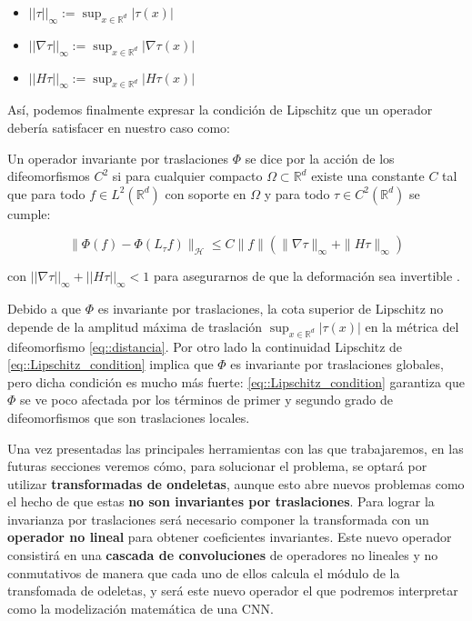\begin{itemize}
  \item $|| \tau ||_\infty := \sup_{x \in \mathbb{R}^d} |\tau(x)|$
  \item $||\nabla \tau ||_\infty := \sup_{x \in \mathbb{R}^d} |\nabla \tau(x)|$
  \item $||H \tau ||_\infty := \sup_{x \in \mathbb{R}^d} |H \tau(x)|$ 
\end{itemize}

\medskip

\noindent Así, podemos finalmente expresar la condición de Lipschitz que un operador debería satisfacer en nuestro caso como: 


\medskip

\begin{definicion} \label{def::Lipschitz_cont}
\noindent Un operador invariante por traslaciones $\Phi$ se dice  por la acción de los difeomorfismos $C^2$  si para cualquier compacto $\Omega \subset \mathbb{R}^d$ existe una constante $C$ tal que para todo $f \in L^2(\mathbb{R}^d)$ con soporte en $\Omega$ y para todo $\tau \in C^2(\mathbb{R}^d)$ se cumple:

\begin{equation} \label{eq::Lipschitz_condition}
  \| \Phi(f)-\Phi(L_{\tau}f)\|_\mathcal{H} \leq C\|f\|(\|\nabla\tau\|_{\infty} + \|H \tau\|_\infty)
\end{equation}

con  $|| \nabla \tau ||_\infty + ||H \tau ||_\infty < 1$ para asegurarnos de que la deformación sea invertible \cite{doi:10.1137/S0036141002404838}.
\end{definicion}

\medskip

\noindent Debido a que $\Phi$ es invariante por traslaciones, la cota superior de Lipschitz no depende de la amplitud máxima de traslación $\sup_{x \in \mathbb{R}^d}|\tau (x)|$ en la métrica del difeomorfismo \eqref{eq::distancia}. Por otro lado la continuidad Lipschitz de \eqref{eq::Lipschitz_condition} implica que $\Phi$ es invariante por traslaciones globales, pero dicha condición es mucho más fuerte: \eqref{eq::Lipschitz_condition} garantiza que $\Phi$ se ve poco afectada por los términos de primer y segundo grado de difeomorfismos que son traslaciones locales.

\medskip


\noindent Una vez presentadas las principales herramientas con las que trabajaremos, en las futuras secciones veremos cómo, para solucionar el problema, se optará por utilizar \textbf{transformadas de ondeletas}, aunque esto abre nuevos problemas como el hecho de que estas \textbf{no son invariantes por traslaciones}. Para lograr la invarianza por traslaciones será necesario componer la transformada con un \textbf{operador no lineal} para obtener coeficientes invariantes. Este nuevo operador consistirá en una \textbf{cascada de convoluciones} de operadores no lineales y no conmutativos de manera que cada uno de ellos calcula el módulo de la transfomada de odeletas, y será este nuevo operador el que podremos interpretar como la modelización matemática de una CNN.


\endinput
